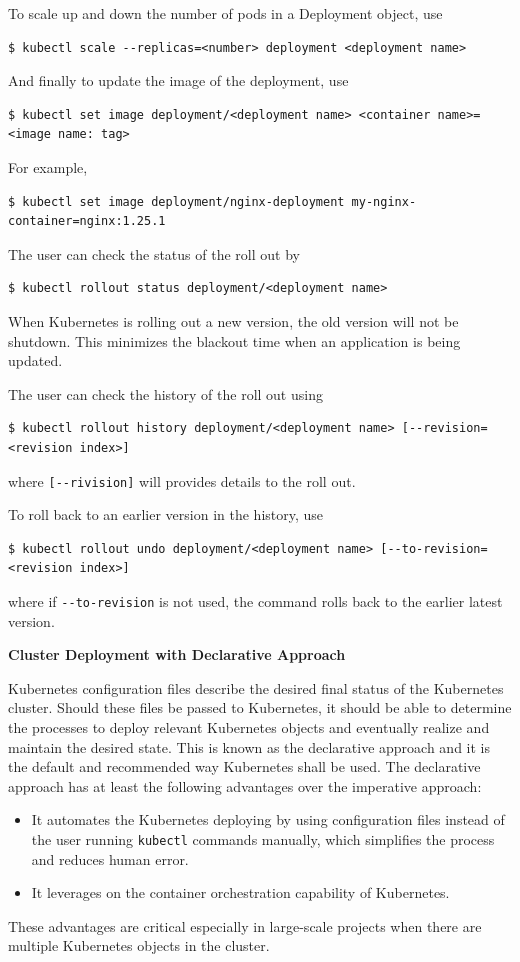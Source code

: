 To scale up and down the number of pods in a Deployment object, use
\begin{lstlisting}
$ kubectl scale --replicas=<number> deployment <deployment name>
\end{lstlisting}

And finally to update the image of the deployment, use
\begin{lstlisting}
$ kubectl set image deployment/<deployment name> <container name>=<image name: tag>
\end{lstlisting}
For example,
\begin{lstlisting}
$ kubectl set image deployment/nginx-deployment my-nginx-container=nginx:1.25.1
\end{lstlisting}

The user can check the status of the roll out by
\begin{lstlisting}
$ kubectl rollout status deployment/<deployment name>
\end{lstlisting}
When Kubernetes is rolling out a new version, the old version will not be shutdown. This minimizes the blackout time when an application is being updated.

The user can check the history of the roll out using
\begin{lstlisting}
$ kubectl rollout history deployment/<deployment name> [--revision=<revision index>]
\end{lstlisting}
where \verb|[--rivision]| will provides details to the roll out.

To roll back to an earlier version in the history, use
\begin{lstlisting}
$ kubectl rollout undo deployment/<deployment name> [--to-revision=<revision index>]
\end{lstlisting}
where if \verb|--to-revision| is not used, the command rolls back to the earlier latest version.

\vspace{0.1in}
\noindent \textbf{Cluster Deployment with Declarative Approach}
\vspace{0.1in}

Kubernetes configuration files describe the desired final status of the Kubernetes cluster. Should these files be passed to Kubernetes, it should be able to determine the processes to deploy relevant Kubernetes objects and eventually realize and maintain the desired state. This is known as the declarative approach and it is the default and recommended way Kubernetes shall be used. The declarative approach has at least the following advantages over the imperative approach:
\begin{itemize}
  \item It automates the Kubernetes deploying by using configuration files instead of the user running \verb|kubectl| commands manually, which simplifies the process and reduces human error.
  \item It leverages on the container orchestration capability of Kubernetes.
\end{itemize}
These advantages are critical especially in large-scale projects when there are multiple Kubernetes objects in the cluster.

